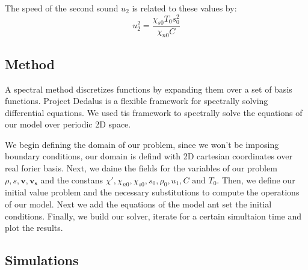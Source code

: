 \documentclass{article}
\begin{document}
The speed of the second sound \(u_2\) is related to these values by:
\[u_2^2 = \frac{\chi_{s0}T_0s_0^2}{\chi_{n0}C}\]
\subsection{Method}
A spectral method discretizes functions by expanding them over a set of basis functions.
Project Dedalus\cite{Dedalus} is a flexible framework for spectrally solving differential equations. We used tis framework to spectrally solve the equations of our model over periodic 2D space.

We begin defining the domain of our problem, since we won't be imposing boundary conditions, our domain is defind with 2D cartesian coordinates over real forier basis.
Next, we daine the fields for the variables of our problem \(\rho, s, \mathbf{v}, \mathbf{v_s}\) and the constans \(\chi', \chi_{n0}, \chi_{s0}, s_0, \rho_0, u_1, C \text{ and } T_0\).
Then, we define our initial value problem and the necessary substitutions to compute the operations of our model.
Next we add the equations of the model ant set the initial conditions. 
Finally, we build our solver, iterate for a certain simultaion time and plot the results.

\subsection{Simulations}
\end{document}

